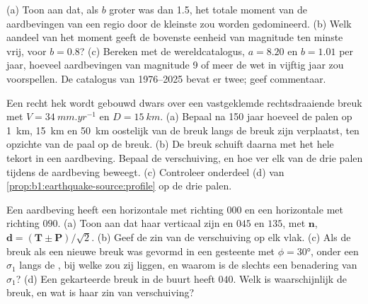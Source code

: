 \begin{exercise}[$\star\star\star$]\label{exo:b1:earthquake-source:10}
(a) Toon aan dat, als $b$ groter was dan 1.5, het totale moment van de aardbevingen van een regio door de kleinste zou worden gedomineerd. (b) Welk aandeel van het moment geeft de bovenste eenheid van magnitude ten minste vrij, voor $b = 0.8$? (c) Bereken met de wereldcatalogus, $a = 8.20$ en $b = 1.01$ per jaar, hoeveel aardbevingen van magnitude 9 of meer de wet in vijftig jaar zou voorspellen. De catalogus van 1976--2025 bevat er twee; geef commentaar.
\end{exercise}

\begin{exercise}[$\star\star\star$]\label{exo:b1:earthquake-source:11}
Een recht hek wordt gebouwd dwars over een vastgeklemde rechtsdraaiende breuk met $V =
\qty{34}{mm.yr^{-1}}$ en $D = \qty{15}{km}$. (a) Bepaal na 150 jaar hoeveel de palen op \qty{1}{km}, \qty{15}{km} en \qty{50}{km} oostelijk van de breuk langs de breuk zijn verplaatst, ten opzichte van de paal op de breuk. (b) De breuk schuift daarna met het hele tekort in een aardbeving. Bepaal de verschuiving, en hoe ver elk van de drie palen tijdens de aardbeving beweegt. (c) Controleer onderdeel (d) van \cref{prop:b1:earthquake-source:profile} op de drie palen.
\end{exercise}

\begin{exercise}[$\star\star\star$]\label{exo:b1:earthquake-source:12}
Een aardbeving heeft een horizontale  met richting $000$ en een horizontale  met richting $090$. (a) Toon aan dat haar  verticaal zijn en  $045$ en $135$, met $\mathbf n$, $\mathbf d = (\mathbf T \pm \mathbf P)/\sqrt2$. (b) Geef de zin van de verschuiving op elk vlak. (c) Als de breuk als een nieuwe breuk was gevormd in een gesteente met $\phi = \ang{30}$, onder een $\sigma_1$ langs de , bij welke  zou zij liggen, en waarom is de  slechts een benadering van $\sigma_1$? (d) Een gekarteerde breuk in de buurt heeft  $040$. Welk  is waarschijnlijk de breuk, en wat is haar zin van verschuiving?
\end{exercise}

